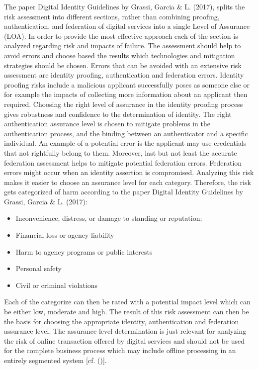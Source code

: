 The paper Digital Identity Guidelines by Grassi, Garcia \& L. (2017), splits the risk assessment into different sections, rather than combining proofing, authentication, and federation of digital services into a single Level of Assurance (LOA). In order to provide the most effective approach each of the section is analyzed regarding risk and impacts of failure. The assessment should help to avoid errors and choose based the results which technologies and mitigation strategies should be chosen. Errors that can be avoided with an extensive risk assessment are identity proofing, authentication and federation errors. Identity proofing risks include a malicious applicant successfully poses as someone else or for example the impacts of collecting more information about an applicant then required. Choosing the right level of assurance in the identity proofing process gives robustness and confidence to the determination of identity. The right authentication assurance level is chosen to mitigate problems in the authentication process, and the binding between an authenticator and a specific individual. An example of a potential error is the applicant may use credentials that not rightfully belong to them. Moreover, last but not least the accurate federation assessment helps to mitigate potential federation errors. Federation errors might occur when an identity assertion is compromised. Analyzing this risk makes it easier to choose an assurance level for each category. Therefore, the risk gets categorized of harm according to the paper Digital Identity Guidelines by Grassi, Garcia \& L. (2017): 

\begin{itemize}
	\item Inconvenience, distress, or damage to standing or reputation;
	\item Financial loss or agency liability
	\item Harm to agency programs or public interests
	\item Personal safety
	\item Civil or criminal violations
\end{itemize}

Each of the categorize can then be rated with a potential impact level which can be either low, moderate and high. The result of this risk assessment can then be the basis for choosing the appropriate identity, authentication and federation assurance level. The assurance level determination is just relevant for analyzing the risk of online transaction offered by digital services and should not be used for the complete business process which may include offline processing in an entirely segmented system [cf. (\cite{NIST:2017:DIG})]. 

